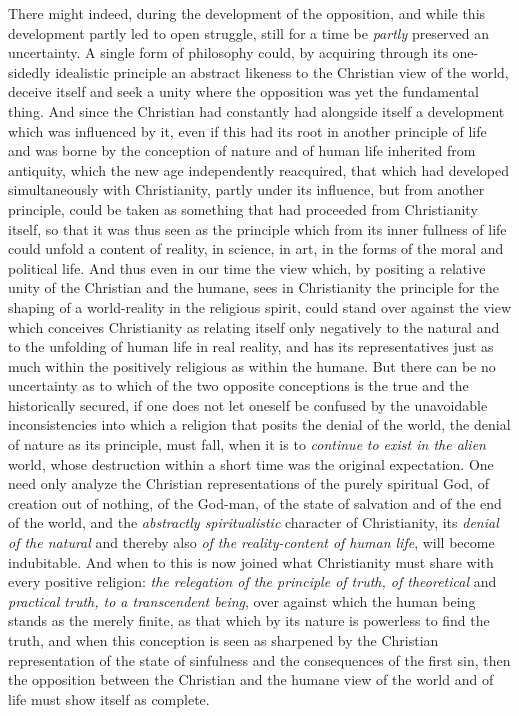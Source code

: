 \documentclass[12pt,a4paper,openany]{book}
\newcommand{\opage}[1]{\marginnote{\footnotesize\textit{[#1]}}}
\begin{document}
There might indeed, during the development of the opposition, and while this
development partly led to open struggle, still for a time be \emph{partly} preserved an
uncertainty. A single form of philosophy could, by acquiring through its one-sidedly
idealistic principle an abstract likeness to the Christian view of the world, deceive
itself and seek a unity where the opposition was yet the fundamental thing. And since
the Christian had constantly had alongside itself a development which was influenced
by it, even if this had its root in another principle of life and was borne by the
conception of nature and of human life inherited from antiquity, which the new age
independently reacquired, that which had developed simultaneously
\setcounter{footnote}{0}%
\opage{216}with Christianity, partly under its influence, but from another principle, could
be taken as something that had proceeded from Christianity itself, so that it was thus
seen as the principle which from its inner fullness of life could unfold a content of
reality, in science, in art, in the forms of the moral and political life. And thus
even in our time the view which, by positing a relative unity of the Christian and the
humane, sees in Christianity the principle for the shaping of a world-reality in the
religious spirit, could stand over against the view which conceives Christianity as
relating itself only negatively to the natural and to the unfolding of human life in
real reality, and has its representatives just as much within the positively religious
as within the humane. But there can be no uncertainty as to which of the two opposite
conceptions is the true and the historically secured, if one does not let oneself be
confused by the unavoidable inconsistencies into which a religion that posits the
denial of the world, the denial of nature as its principle, must fall, when it is to
\emph{continue}
\emph{to exist in the alien} world, whose destruction within a short time was the
original expectation. One need only analyze the Christian representations of the purely
spiritual God, of creation out of nothing, of the God-man, of the state of salvation
and of the end of the world, and the
\emph{abstractly spiritualistic} character of Christianity,
its \emph{denial of the natural} and thereby
also \emph{of the reality-content of human life}, will
become indubitable. And when to this is now joined what Christianity must share with
every positive religion: \emph{the relegation
of the principle of truth, of theoretical} and
\emph{practical truth, to a transcendent
being}, over against which the human being stands as the merely finite, as that which
by its nature is powerless to find the truth, and when this conception is seen as
sharpened by the Christian representation of the state of sinfulness
\setcounter{footnote}{0}%
\opage{217}and the consequences of the first sin, then the opposition between the Christian and
the humane view of the world and of life must show itself as complete.
\end{document}
